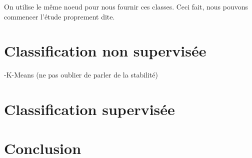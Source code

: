 On utilise le même noeud pour nous fournir ces classes. Ceci fait, nous pouvons commencer l'étude proprement dite.

\section{Classification non supervisée}


-K-Means (ne pas oublier de parler de la stabilité)




\section{Classification supervisée}






\section{Conclusion}


